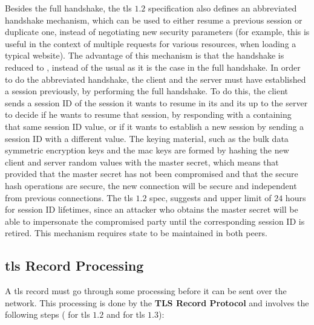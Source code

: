 \documentclass{llncs}
\begin{document}
Besides the full handshake, the \gls{tls} $1.2$ specification also defines an
abbreviated handshake mechanism, which can be used to either resume a previous session
or duplicate one, instead of negotiating new security parameters (for example, this is useful
in the context of multiple  requests for various resources, when loading
a typical website). The advantage of this mechanism is that the handshake is reduced
to , instead of the usual  as it is the case in
the full handshake. In order to do the abbreviated handshake,
the client and the server must have established a session previously, by performing
the full handshake. To do this, the client sends a session ID of the session it wants to
resume in its  and its up to the server to decide if he
wants to resume that session, by responding with a  containing
that same session ID value, or if it wants to establish a new session by
sending a session ID with a different value. The keying material, such as the bulk
data symmetric encryption keys and the \gls{mac} keys are formed by hashing the new client
and server random values with the master secret, which means
that provided that the master secret has not been compromised and that the secure
hash operations are secure, the new connection will be secure and independent
from previous connections. The \gls{tls} $1.2$ spec, suggests and upper limit
of $24$ hours for session ID lifetimes, since an attacker who obtains the master secret
will be able to impersonate the compromised party until the corresponding session
ID is retired. This mechanism requires state to be maintained in both peers.

\subsection{\gls{tls} Record Processing}

A \gls{tls} record must go through some processing before it can be sent over the network.
This processing is done by the \textbf {TLS Record Protocol} and involves the following steps ( for \gls{tls} $1.2$ and  for \gls{tls} $1.3$):
\end{document}
